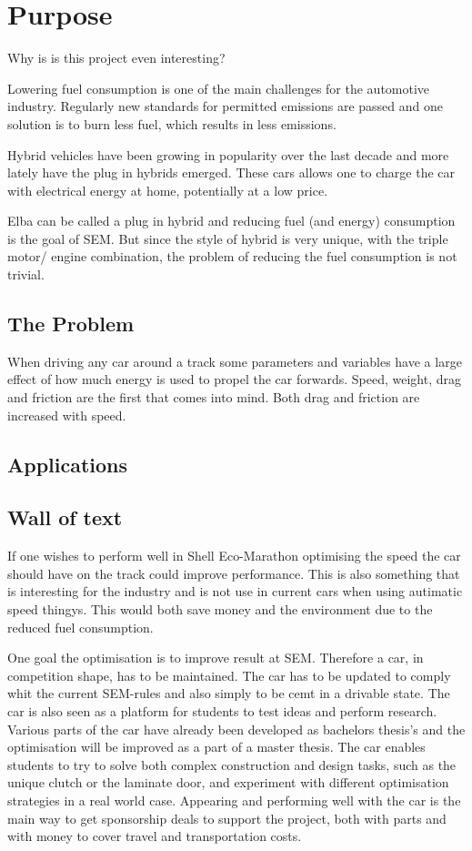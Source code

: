 \chapter{Purpose}

Why is is this project even interesting?

Lowering fuel consumption is one of the main challenges for the automotive 
industry. Regularly new standards for permitted emissions are passed and  
one solution is to burn less fuel, which results in less emissions.

Hybrid vehicles have been growing in popularity over the last decade and 
more lately have the plug in hybrids emerged. These cars allows one 
to charge the car with electrical energy at home, potentially at a low price.

Elba can be called a plug in hybrid and reducing fuel (and energy) consumption is the goal
of SEM\@. But since the style of hybrid is very unique, with the triple motor/ engine
combination, the problem of reducing the fuel consumption is not trivial. 

\section{The Problem}
When driving any car around a track some parameters and variables have a large effect of
how much energy is used to propel the car forwards. Speed, weight, drag and friction are
the first that comes into mind. Both drag and friction are increased with speed.

\section{Applications}

\section{Wall of text}
If one wishes to perform well in Shell Eco-Marathon optimising the speed the car should have on the track could improve performance. 
This is also something that is interesting for the industry and is not use in current cars when using autimatic speed thingys. This would both save money and the environment due to the reduced fuel consumption.

One goal the optimisation is to improve result at SEM. Therefore a car, in competition shape, has to be maintained. The car has to be updated to comply whit the current SEM-rules and also simply to be cemt in a drivable state. The car is also seen as a platform for students to test ideas and perform research. Various parts of the car have already been developed as bachelors thesis's and the optimisation will be improved as a part of a master thesis. The car enables students to try to solve both complex construction and design tasks, such as the unique clutch or the laminate door, and experiment with different optimisation strategies in a real world case. Appearing and performing well with the car is the main way to get sponsorship deals to support the project, both with parts and with money to cover travel and transportation costs.

